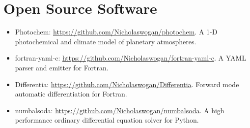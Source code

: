 \documentclass[12pt]{article}
\begin{document}
\section{Open Source Software}

\begin{itemize}
  \item Photochem: \url{https://github.com/Nicholaswogan/photochem}. A 1-D photochemical and climate model of planetary atmospheres.
  \item fortran-yaml-c: \url{https://github.com/Nicholaswogan/fortran-yaml-c}. A YAML parser and emitter for Fortran.
  \item Differentia: \url{https://github.com/Nicholaswogan/Differentia}. Forward mode automatic differentiation for Fortran.
  \item numbalsoda: \url{https://github.com/Nicholaswogan/numbalsoda}. A high performance ordinary differential equation solver for Python.
\end{itemize}
\end{document}
